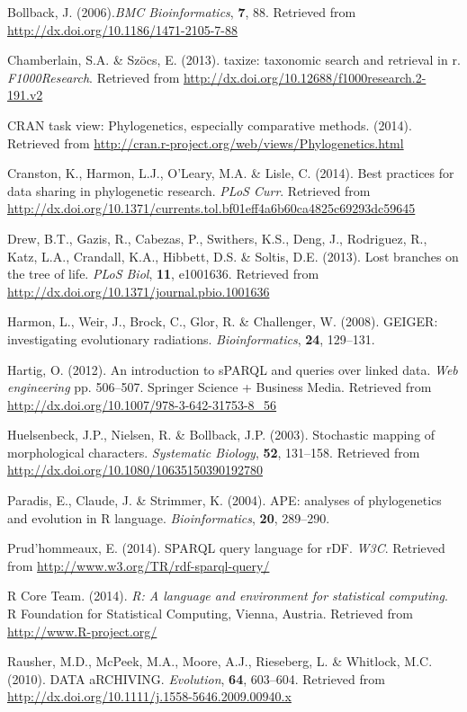 \documentclass[author-year, review, 11pt]{components/elsarticle} %
\begin{document}
Bollback, J. (2006).\emph{BMC Bioinformatics}, \textbf{7}, 88. Retrieved
from \url{http://dx.doi.org/10.1186/1471-2105-7-88}

Chamberlain, S.A. \& Sz{ö}cs, E. (2013). taxize: taxonomic search and
retrieval in r. \emph{F1000Research}. Retrieved from
\url{http://dx.doi.org/10.12688/f1000research.2-191.v2}

CRAN task view: Phylogenetics, especially comparative methods. (2014).
Retrieved from
\url{http://cran.r-project.org/web/views/Phylogenetics.html}

Cranston, K., Harmon, L.J., O'Leary, M.A. \& Lisle, C. (2014). Best
practices for data sharing in phylogenetic research. \emph{PLoS Curr}.
Retrieved from
\url{http://dx.doi.org/10.1371/currents.tol.bf01eff4a6b60ca4825c69293dc59645}

Drew, B.T., Gazis, R., Cabezas, P., Swithers, K.S., Deng, J., Rodriguez,
R., Katz, L.A., Crandall, K.A., Hibbett, D.S. \& Soltis, D.E. (2013).
Lost branches on the tree of life. \emph{PLoS Biol}, \textbf{11},
e1001636. Retrieved from
\url{http://dx.doi.org/10.1371/journal.pbio.1001636}

Harmon, L., Weir, J., Brock, C., Glor, R. \& Challenger, W. (2008).
GEIGER: investigating evolutionary radiations. \emph{Bioinformatics},
\textbf{24}, 129--131.

Hartig, O. (2012). An introduction to sPARQL and queries over linked
data. \emph{Web engineering} pp. 506--507. Springer Science + Business
Media. Retrieved from
\url{http://dx.doi.org/10.1007/978-3-642-31753-8_56}

Huelsenbeck, J.P., Nielsen, R. \& Bollback, J.P. (2003). Stochastic
mapping of morphological characters. \emph{Systematic Biology},
\textbf{52}, 131--158. Retrieved from
\url{http://dx.doi.org/10.1080/10635150390192780}

Paradis, E., Claude, J. \& Strimmer, K. (2004). APE: analyses of
phylogenetics and evolution in R language. \emph{Bioinformatics},
\textbf{20}, 289--290.

Prud'hommeaux, E. (2014). SPARQL query language for rDF. \emph{W3C}.
Retrieved from \url{http://www.w3.org/TR/rdf-sparql-query/}

R Core Team. (2014). \emph{R: A language and environment for statistical
computing}. R Foundation for Statistical Computing, Vienna, Austria.
Retrieved from \url{http://www.R-project.org/}

Rausher, M.D., McPeek, M.A., Moore, A.J., Rieseberg, L. \& Whitlock,
M.C. (2010). DATA aRCHIVING. \emph{Evolution}, \textbf{64}, 603--604.
Retrieved from \url{http://dx.doi.org/10.1111/j.1558-5646.2009.00940.x}
\end{document}
